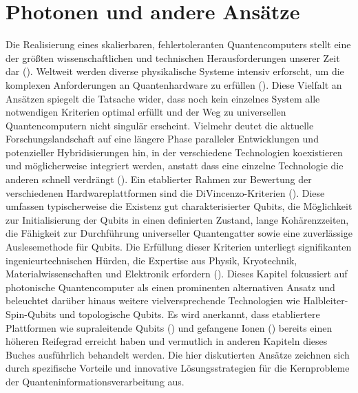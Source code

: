 
\section{Photonen und andere Ansätze}
Die Realisierung eines skalierbaren, fehlertoleranten Quantencomputers stellt eine der größten wissenschaftlichen und technischen Herausforderungen unserer Zeit dar (\cite{QuantumHardwareExplained}). Weltweit werden diverse physikalische Systeme intensiv erforscht, um die komplexen Anforderungen an Quantenhardware zu erfüllen (\cite{chengNoisyIntermediatescaleQuantum2023}). Diese Vielfalt an Ansätzen spiegelt die Tatsache wider, dass noch kein einzelnes System alle notwendigen Kriterien optimal erfüllt und der Weg zu universellen Quantencomputern nicht singulär erscheint. Vielmehr deutet die aktuelle Forschungslandschaft auf eine längere Phase paralleler Entwicklungen und potenzieller Hybridisierungen hin, in der verschiedene Technologien koexistieren und möglicherweise integriert werden, anstatt dass eine einzelne Technologie die anderen schnell verdrängt (\cite{QuantumHardwareExplained}).
\newline \newline
Ein etablierter Rahmen zur Bewertung der verschiedenen Hardwareplattformen sind die DiVincenzo-Kriterien (\cite{QuantumComputingArchitecture}). Diese umfassen typischerweise die Existenz gut charakterisierter Qubits, die Möglichkeit zur Initialisierung der Qubits in einen definierten Zustand, lange Kohärenzzeiten, die Fähigkeit zur Durchführung universeller Quantengatter sowie eine zuverlässige Auslesemethode für Qubits. Die Erfüllung dieser Kriterien unterliegt signifikanten ingenieurtechnischen Hürden, die Expertise aus Physik, Kryotechnik, Materialwissenschaften und Elektronik erfordern (\cite{QuantumHardwareExplained}).
\newline \newline
Dieses Kapitel fokussiert auf photonische Quantencomputer als einen prominenten alternativen Ansatz und beleuchtet darüber hinaus weitere vielversprechende Technologien wie Halbleiter-Spin-Qubits und topologische Qubits. Es wird anerkannt, dass etabliertere Plattformen wie supraleitende Qubits (\cite{QuantumComputingArchitecture}) und gefangene Ionen (\cite{sruthisomarouthuQuantumComputingDigital2025}) bereits einen höheren Reifegrad erreicht haben und vermutlich in anderen Kapiteln dieses Buches ausführlich behandelt werden. Die hier diskutierten Ansätze zeichnen sich durch spezifische Vorteile und innovative Lösungsstrategien für die Kernprobleme der Quanteninformationsverarbeitung aus.
